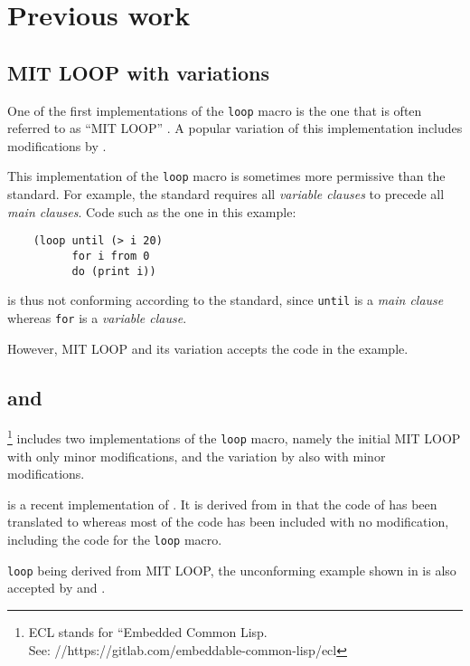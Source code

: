 \section{Previous work}

\subsection{MIT LOOP with variations}
\label{sec-mit-loop}

One of the first implementations of the \commonlisp{} \texttt{loop}
macro is the one that is often referred to as ``MIT LOOP''
\cite{Burke:Moon:MIT.loop}.  A popular variation of this
implementation includes modifications by \symbolics{}.

This implementation of the \texttt{loop} macro is sometimes more
permissive than the \commonlisp{} standard.  For example, the standard
requires all \emph{variable clauses} to precede all \emph{main
  clauses}.  Code such as the one in this example:

\begin{verbatim}
    (loop until (> i 20)
          for i from 0
          do (print i))
\end{verbatim}

\noindent
is thus not conforming according to the standard, since \texttt{until}
is a \emph{main clause} whereas \texttt{for} is a \emph{variable
  clause}.

However, MIT LOOP and its variation accepts the code in the example.

\subsection{\ecl{} and \clasp{}}

\ecl{}%
\footnote{ECL stands for ``Embedded Common Lisp.\\
See: //https://gitlab.com/embeddable-common-lisp/ecl}
includes two implementations of the \texttt{loop} macro, namely
the initial MIT LOOP with only minor modifications, and the variation
by \symbolics{} also with minor modifications.

\clasp{} is a recent implementation of \commonlisp{}.  It is derived
from \ecl{} in that the \clanguage{} code of \ecl{} has been
translated to \cplusplus{} whereas most of the \commonlisp{} code has
been included with no modification, including the code for the
\texttt{loop} macro.

\ecl{} \texttt{loop} being derived from MIT LOOP, the unconforming
example shown in  is also accepted by \ecl{} and
\clasp{}.

